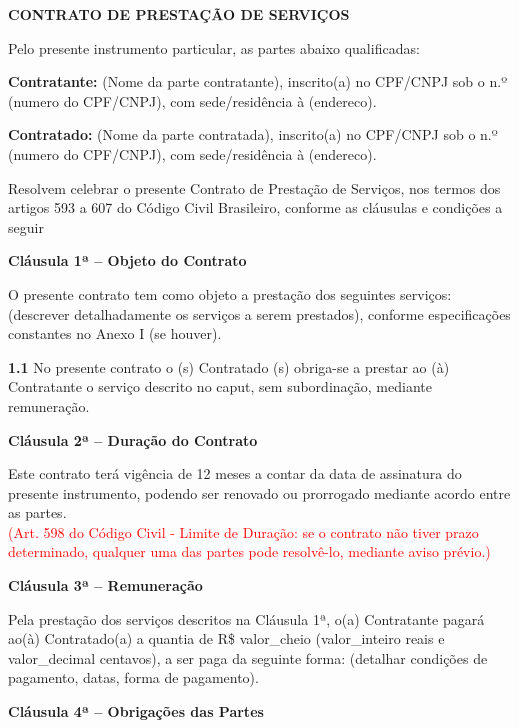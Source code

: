 \documentclass[a4paper,12pt]{article}
\begin{document}
\large{\textbf{CONTRATO DE PRESTAÇÃO DE SERVIÇOS}}

\normalsize
Pelo presente instrumento particular, as partes abaixo qualificadas:

\noindent \textbf{Contratante:} (Nome da parte contratante), inscrito(a) no CPF/CNPJ sob o n.º (numero do CPF/CNPJ), com sede/residência à (endereco).

\noindent \textbf{Contratado:} (Nome da parte contratada), inscrito(a) no CPF/CNPJ sob o n.º (numero do CPF/CNPJ), com sede/residência à (endereco).

\noindent Resolvem celebrar o presente Contrato de Prestação de Serviços, nos termos dos artigos 593 a 607 do Código Civil Brasileiro, conforme as cláusulas e condições a seguir
\vspace{0.5cm}

\large{\textbf{Cláusula 1ª – Objeto do Contrato}}
\normalsize

O presente contrato tem como objeto a prestação dos seguintes serviços: (descrever detalhadamente os serviços a serem prestados), conforme especificações constantes no Anexo I (se houver).

\textbf{1.1} No presente contrato o (s)  Contratado (s) obriga-se a prestar ao (à) Contratante o serviço descrito no caput, sem subordinação, mediante remuneração.

\large{\textbf{Cláusula 2ª – Duração do Contrato}}
\normalsize

Este contrato terá vigência de 12 meses a contar da data de assinatura do presente instrumento, podendo ser renovado ou prorrogado mediante acordo entre as partes.\\
\textcolor{red}{(Art. 598 do Código Civil - Limite de Duração: se o contrato não tiver prazo determinado, qualquer uma das partes pode resolvê-lo, mediante aviso prévio.)}

\large{\textbf{Cláusula 3ª – Remuneração}}
\normalsize

Pela prestação dos serviços descritos na Cláusula 1ª, o(a) Contratante pagará ao(à) Contratado(a) a quantia de R\$ valor_cheio (valor_inteiro reais e valor_decimal centavos), a ser paga da seguinte forma: (detalhar condições de pagamento, datas, forma de pagamento).

\large{\textbf{Cláusula 4ª – Obrigações das Partes}}
\normalsize
\end{document}
